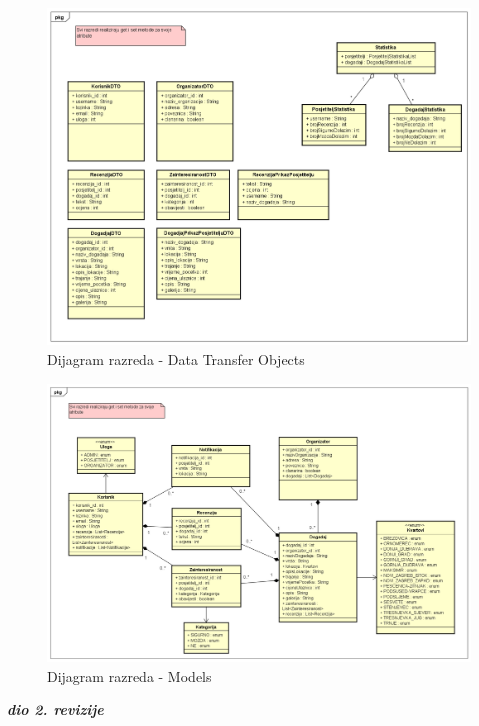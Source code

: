 			\begin{figure}[H]
				\includegraphics[scale=0.4]{dijagramiKlasa/Dijagram razreda - DTO.png} %
				\centering
				\caption{Dijagram razreda - Data Transfer Objects}
				\label{fig:promjene}
			\end{figure}
			
			
			\begin{figure}[H]
				\includegraphics[scale=0.4]{dijagramiKlasa/Dijagram razreda - Models v5.png} %
				\centering
				\caption{Dijagram razreda - Models}
				\label{fig:promjene}
			\end{figure}
			
			\textbf{\textit{dio 2. revizije}}\\			
			
